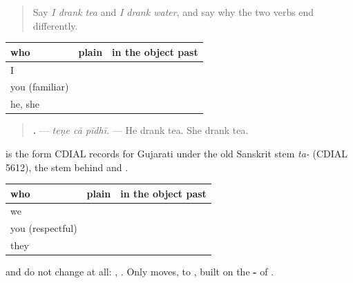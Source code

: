 \label{lesson:GU-C148-tene}



\begin{quote}
Say \emph{I drank tea} and \emph{I drank water}, and say why the two verbs end differently.
\end{quote}

\begin{grammarlens}[title={Grammar Lens: one person}]
\noindent
\begin{tabularx}{\linewidth}{@{}>{\raggedright\arraybackslash}X>{\raggedright\arraybackslash}X>{\raggedright\arraybackslash}X@{}}
\toprule
\textbf{who} & \textbf{plain} & \textbf{in the object past} \\
\midrule
I & \gu{હું} & \gu{મેં} \\
you (familiar) & \gu{તું} & \gu{તેં} \\
he, she & \gu{તે} & \gu{તેણે} \\
\bottomrule
\end{tabularx}

\begin{quote}
\textbf{  .} — \emph{teṇe cā pīdhī.} — He drank tea. She drank tea.
\end{quote}

\textbf{} is the form CDIAL records for Gujarati under the old Sanskrit stem \emph{ta-} (CDIAL 5612), the stem behind \textbf{} and \textbf{}.
\end{grammarlens}

\begin{grammarlens}[title={Grammar Lens: more than one}]
\noindent
\begin{tabularx}{\linewidth}{@{}>{\raggedright\arraybackslash}X>{\raggedright\arraybackslash}X>{\raggedright\arraybackslash}X@{}}
\toprule
\textbf{who} & \textbf{plain} & \textbf{in the object past} \\
\midrule
we & \gu{અમે} & \gu{અમે} \\
you (respectful) & \gu{તમે} & \gu{તમે} \\
they & \gu{તેઓ} & \gu{તેમણે} \\
\bottomrule
\end{tabularx}

\textbf{} and \textbf{} do not change at all: \textbf{  }, \textbf{  }. Only \textbf{} moves, to \textbf{}, built on the \textbf{-} of \textbf{}.
\end{grammarlens}

